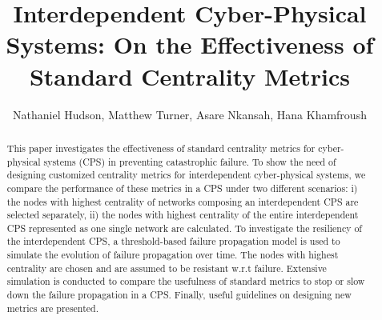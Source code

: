 \documentclass[letterpaper, 10 pt, conference]{ieeeconf}  %
\title{\LARGE \bf
Interdependent Cyber-Physical Systems: On the Effectiveness of Standard Centrality Metrics
}
\author{Nathaniel Hudson, Matthew Turner, Asare Nkansah, Hana Khamfroush} %
\begin{document}
\maketitle
\thispagestyle{empty}
\pagestyle{empty}


\begin{abstract}
This paper investigates the effectiveness of standard centrality metrics for cyber-physical systems (CPS) in preventing catastrophic failure. To show the need of designing customized centrality metrics for interdependent cyber-physical systems, we compare the performance of these metrics in a CPS under two different scenarios: i) the nodes with highest centrality of networks composing an interdependent CPS are selected separately, ii) the nodes with highest centrality of the entire interdependent CPS represented as one single network are calculated. To investigate the resiliency of the interdependent CPS, a threshold-based failure propagation model is used to simulate the evolution of failure propagation over time. The nodes with highest centrality are chosen and are assumed to be resistant w.r.t failure. Extensive simulation is conducted to compare the usefulness of standard metrics to stop or slow down the failure propagation in a CPS. Finally, useful guidelines on designing new metrics are presented.

\end{abstract}

\end{document}
